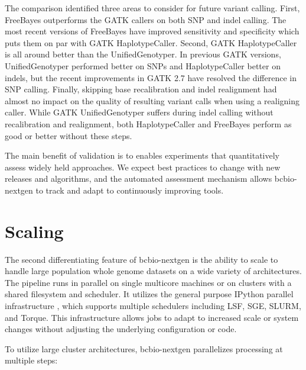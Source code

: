 \documentclass{frontiersSCNS}
\begin{document}
The comparison identified three areas to consider for future variant calling.
First, FreeBayes outperforms the GATK callers on both SNP and indel calling. The
most recent versions of FreeBayes have improved sensitivity and specificity
which puts them on par with GATK HaplotypeCaller. Second, GATK HaplotypeCaller
is all around better than the UnifiedGenotyper. In previous GATK versions,
UnifiedGenotyper performed better on SNPs and HaplotypeCaller
better on indels, but the recent improvements in GATK 2.7 have resolved the
difference in SNP calling. Finally, skipping base recalibration and indel
realignment had almost no impact on the quality of resulting variant calls when
using a realigning caller.  While GATK UnifiedGenotyper suffers during indel
calling without recalibration and realignment, both HaplotypeCaller and
FreeBayes perform as good or better without these steps.

The main benefit of validation is to enables experiments that quantitatively
assess widely held approaches. We expect best practices to change with new
releases and algorithms, and the automated assessment mechanism allows
bcbio-nextgen to track and adapt to continuously improving tools.

\FloatBarrier

\section*{Scaling}

The second differentiating feature of bcbio-nextgen is the ability to scale to
handle large population whole genome datasets on a wide variety of
architectures. The pipeline runs in parallel on single multicore machines or on
clusters with a shared filesystem and scheduler. It utilizes the general purpose
IPython parallel infrastructure \citep{IPython}, which supports multiple
schedulers including LSF, SGE, SLURM, and Torque. This infrastructure allows
jobs to adapt to increased scale or system changes without adjusting the
underlying configuration or code.

To utilize large cluster architectures, bcbio-nextgen parallelizes
processing at multiple steps:
\end{document}
